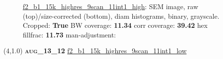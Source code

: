 \begin{figure}[h!]
\label{semimg21}
\caption*{\hyperlink{covtableaug_13_12}{\color{blue} \small \ttfamily f2\_b1\_15k\_highres\_9scan\_11int1\_high}: SEM image, raw (top)/size-corrected (bottom), diam histograms, binary, grayscale.\\Cropped: {\bf True} \;\; BW coverage: {\bf 11.34} \:\: corr coverage: {\bf 39.42} \:\: hex fillfrac: {\bf 11.73} \:\: man-adjustment: {\bf \color{blue}{Yes}}}
\end{figure}
\newpage

\begin{textblock}{5}(4,1.0)
{\bf \textsc{aug\_13\_12}}
\hspace{4.5cm}
\hyperlink{covtableaug_13_12}{\color{blue} \large \ttfamily f2\_b1\_15k\_highres\_9scan\_11int1\_low}
\end{textblock}

